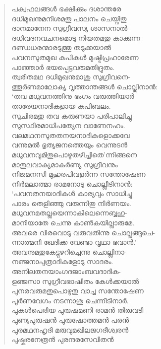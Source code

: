 \begin{verse}
പക്വഫലങ്ങള്‍ ഭക്ഷിക്കും ദശാന്തരേ\\
ദധിമുഖനുമനിശമതു പാലനം ചെയ്വിതു\\
ദാനമാനേന സുഗ്രീവസ്യ ശാസനാല്‍\\
ദധിവദനവചനമൊടു നിയതമതു കാക്കുന്ന\\
ദണ്ഡധരന്മാരടുത്തു തടുക്കയാല്‍\\
പവനസുതമുഖ കപികള്‍ മുഷ്ടിപ്രഹാരേണ\\
പാഞ്ഞാര്‍ ഭയപ്പെട്ടവരുമതിദ്രുതം.\\
ത്വരിതമഥ ദധിമുഖനുമാശു സുഗ്രീവനെ-\\
ത്തൂര്‍ണമാലോക്യ വൃത്താന്തങ്ങള്‍ ചൊല്ലിനാന്‍:\\
‘തവ മധുവനത്തിനു ഭംഗം വരുത്തിയാര്‍\\
താരേയനാദികളായ കപിബലം.\\
സുചിരമതു തവ കരുണയാ പരിപാലിച്ചു\\
സുസ്ഥിരമാധിപത്യേന വാണേനഹം.\\
വലമഥനസുതതനയനാദികളൊക്കവേ\\
വന്നുമല്‍ ഭൃത്യജനത്തെയും വെന്നുടന്‍\\
മധുവനവുമിതുപൊഴുതഴിച്ചിതെ’ന്നിങ്ങനെ\\
മാതുലവാക്യമാകര്‍ണ്യ സുഗ്രീവനും\\
നിജമനസി മുഹുരപിവളര്‍ന്ന സന്തോഷേണ\\
നിര്‍മലാത്മാ രാമനോടു ചൊല്ലീടിനാന്‍:\\
‘പവനതനയാദികള്‍ കാര്യവും സാധിച്ചു\\
പാരം തെളിഞ്ഞു വരുന്നിതു നിര്‍ണയം.\\
മധുവനമതല്ലയെന്നാകിലെന്നെബ്ബഹു-\\
മാനിയാതേ ചെന്നു കാണ്‍കയില്ലാരുമേ.\\
അവരെ വിരവൊടു വരുവതിന്നു ചൊല്ലങ്ങുചെ-\\
ന്നാത്മനി ഖേദിക്ക വേണ്ടാ വൃഥാ ഭവാന്‍.’\\
അവനുമതുകേട്ടുഴറിച്ചെന്നു ചൊല്ലിനാ-\\
നഞ്ജനാപുത്രാദികളോടു സാദരം.\\
അനിലതനയാംഗദജാംബവദാദിക-\\
ളഞ്ജസാ സുഗ്രീവഭാഷിതം കേള്‍ക്കയാല്‍\\
പുനരവരുമതുപൊഴുതു വാച്ച സന്തോഷേണ\\
പൂര്‍ണവേഗം നടന്നാശു ചെന്നീടിനാര്‍.\\
പുകള്‍പെരിയ പുരുഷമണി രാമന്‍ തിരുവടി\\
പുണ്യപുരുഷന്‍ പുരുഷോത്തമന്‍ പരന്‍\\
പുരമഥനഹൃദി മരുവുമഖിലജഗദീശ്വരന്‍\\
പുഷ്കരനേത്രന്‍ പുരന്ദരസേവിതന്‍\\

\end{verse}
